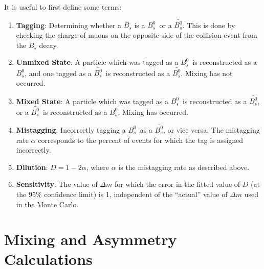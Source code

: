 \documentclass[10pt]{article}
\newcommand{\Bs}{\mbox{$B_{s}^{0}$}}
\newcommand{\Bsbar}{\mbox{$\bar{B_{s}^{0}}$}}
\begin{document}
It is useful to first define some terms:
\begin{enumerate}
\item {\bf Tagging}: Determining whether a $B_s$ is a \Bs\ or a
\Bsbar . This is done by checking the charge of muons on the
opposite side of the collision event from the $B_s$ decay.

\item {\bf Unmixed State}: A particle which was tagged as a \Bs\
is reconstructed as a \Bs, and one tagged as a \Bsbar\ is
reconstructed as a \Bsbar. Mixing has not occurred.

\item {\bf Mixed State}: A particle which was tagged as a \Bs\ is
reconstructed as a \Bsbar, or a \Bsbar\ is reconstructed as a \Bs.
Mixing has occurred. 

\item {\bf Mistagging}: Incorrectly tagging a
\Bs\ as a \Bsbar, or vice versa. The mistagging rate $\alpha$
corresponds to the percent of events for which the tag is assigned
incorrectly. 

\item {\bf Dilution}: $D = 1-2\alpha$, where $\alpha$ is the mistagging rate
as described above.

\item {\bf Sensitivity}: The value of $\Delta m$ for which the 
error in the fitted value of $D$ (at the 95\% confidence limit) is 1, independent of the
``actual'' value of $\Delta m$ used in the Monte Carlo.
\end{enumerate}
\section{Mixing and Asymmetry Calculations \label{calcs}}
\end{document}
